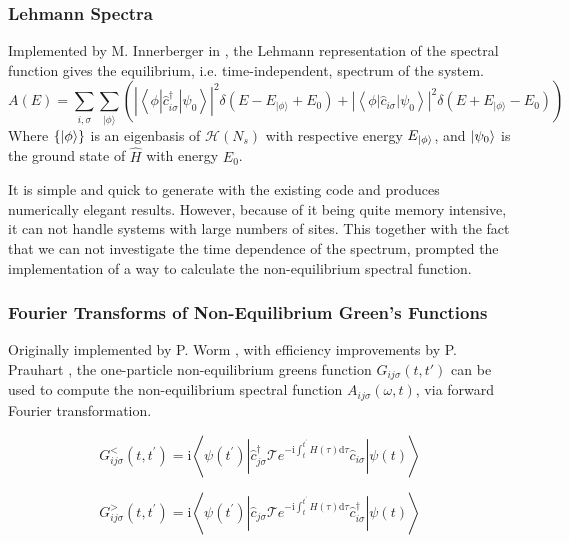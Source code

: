 \subsubsection{Lehmann Spectra}
Implemented by M. Innerberger in \cite{innerberger}, the Lehmann representation of the spectral function gives the equilibrium, i.e. time-independent, spectrum of the system. 
\begin{equation}
    A(E)=\sum_{i, \sigma} \sum_{|\phi\rangle}\left(\left|\left\langle\phi\left|\hat{c}_{i \sigma}^{\dagger}\right| \psi_{0}\right\rangle\right|^{2} \delta\left(E-E_{|\phi\rangle}+E_{0}\right)+\left|\left\langle\phi\left|\hat{c}_{i \sigma}\right| \psi_{0}\right\rangle\right|^{2} \delta\left(E+E_{|\phi\rangle}-E_{0}\right)\right)
\end{equation}
Where $\{ \ket{\phi}\}$ is an eigenbasis of $\mathcal{H}(N_s)$ with respective energy $E_{\ket{\phi}}$, and $\ket{\psi_0}$ is the ground state of $\hat{H}$ with energy $E_0$.

\bigskip
It is simple and quick to generate with the existing code and produces numerically elegant results. However, because of it being quite memory intensive, it can not handle systems with large numbers of sites. This together with the fact that we can not investigate the time dependence of the spectrum, prompted the implementation of a way to calculate the non-equilibrium spectral function.

\subsubsection{Fourier Transforms of Non-Equilibrium Green's Functions}

Originally implemented by P. Worm \cite{worm_bachelor}, with efficiency improvements by P. Prauhart \cite{prauhart}, the one-particle non-equilibrium greens function $G_{ij\sigma} (t,t')$ can be used to compute the non-equilibrium spectral function $A_{ij\sigma}(\omega, t)$, via forward Fourier transformation.

\begin{equation}
    G_{i j \sigma}^{<}\left(t, t^{\prime}\right)=\mathrm{i}\left\langle\psi\left(t^{\prime}\right)\left|\hat{c}_{j \sigma}^{\dagger} \mathcal{T} e^{-\mathrm{i} \int_{t}^{t^{\prime}} H(\tau) \mathrm{d} \tau} \hat{c}_{i \sigma}\right| \psi(t)\right\rangle\label{eq:greens_function_lesser}
\end{equation}

\begin{equation}
    G_{i j \sigma}^{>}\left(t, t^{\prime}\right)=\mathrm{i}\left\langle\psi\left(t^{\prime}\right)\left|\hat{c}_{j \sigma} \mathcal{T} e^{-\mathrm{i} \int_{t}^{t^{\prime}} H(\tau) \mathrm{d} \tau} \hat{c}_{i \sigma}^\dagger\right| \psi(t)\right\rangle\label{eq:greens_function_greater}
\end{equation}

